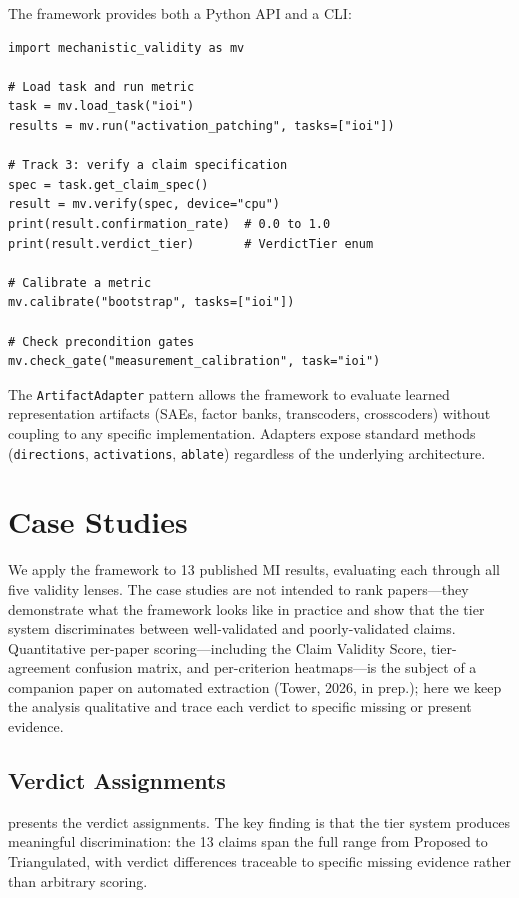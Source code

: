 \documentclass[10pt]{article}
\begin{document}
The framework provides both a Python API and a CLI:

\begin{verbatim}
import mechanistic_validity as mv

# Load task and run metric
task = mv.load_task("ioi")
results = mv.run("activation_patching", tasks=["ioi"])

# Track 3: verify a claim specification
spec = task.get_claim_spec()
result = mv.verify(spec, device="cpu")
print(result.confirmation_rate)  # 0.0 to 1.0
print(result.verdict_tier)       # VerdictTier enum

# Calibrate a metric
mv.calibrate("bootstrap", tasks=["ioi"])

# Check precondition gates
mv.check_gate("measurement_calibration", task="ioi")
\end{verbatim}

The \texttt{ArtifactAdapter} pattern allows the framework to evaluate learned representation artifacts (SAEs, factor banks, transcoders, crosscoders) without coupling to any specific implementation. Adapters expose standard methods (\texttt{directions}, \texttt{activations}, \texttt{ablate}) regardless of the underlying architecture.

\section{Case Studies}
\label{sec:case-studies}

We apply the framework to 13 published MI results, evaluating each through all five validity lenses. The case studies are not intended to rank papers---they demonstrate what the framework looks like in practice and show that the tier system discriminates between well-validated and poorly-validated claims. Quantitative per-paper scoring---including the Claim Validity Score, tier-agreement confusion matrix, and per-criterion heatmaps---is the subject of a companion paper on automated extraction (Tower, 2026, in prep.); here we keep the analysis qualitative and trace each verdict to specific missing or present evidence.

\subsection{Verdict Assignments}

 presents the verdict assignments. The key finding is that the tier system produces meaningful discrimination: the 13 claims span the full range from Proposed to Triangulated, with verdict differences traceable to specific missing evidence rather than arbitrary scoring.
\end{document}
